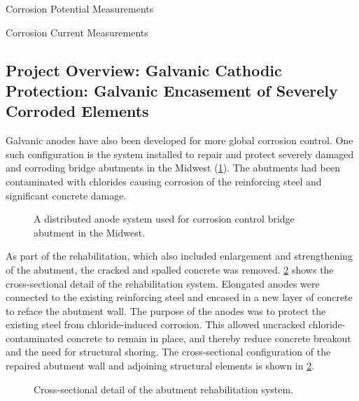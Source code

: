 \begin{table}
  \caption{Corrosion Potential Measurements}\label{tab:corrosion-potential-measurements}
\end{table}

\begin{table}
  \caption{Corrosion Current Measurements}\label{tab:corrosion-current-measurements}
\end{table}

\subsection{Project Overview: Galvanic Cathodic Protection: Galvanic Encasement of Severely Corroded Elements}
Galvanic anodes have also been developed for more global corrosion control. One such configuration is the system installed to repair and protect severely damaged and corroding bridge abutments in the Midwest (\cref{fig:distribute-anode}). The abutments had been contaminated with chlorides causing corrosion of the reinforcing steel and significant concrete damage.

\begin{figure}
  \caption{A distributed anode system used for corrosion control bridge abutment in the Midwest.}\label{fig:distribute-anode}
\end{figure}

As part of the rehabilitation, which also included enlargement and strengthening of the abutment, the cracked and spalled concrete was removed. \cref{fig:abutment-section-rehabilitation} shows the cross-sectional detail of the rehabilitation system. Elongated anodes were connected to the existing reinforcing steel and encased in a new layer of concrete to reface the abutment wall. The purpose of the anodes was to protect the existing steel from chloride-induced corrosion. This allowed uncracked chloride-contaminated concrete to remain in place, and thereby reduce concrete breakout and the need for structural shoring. The cross-sectional configuration of the repaired abutment wall and adjoining structural elements is shown in \cref{fig:abutment-section-rehabilitation}.

\begin{figure}
  \caption{Cross-sectional detail of the abutment rehabilitation system.}\label{fig:abutment-section-rehabilitation}
\end{figure}

